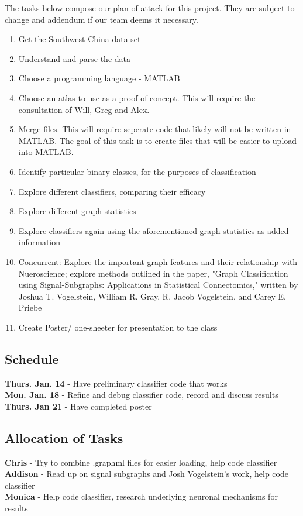\documentclass[11pt]{article} %
\begin{document}
The tasks below compose our plan of attack for this project. They are subject to change and addendum if our team deems it necessary.
\begin{enumerate}
\item Get the Southwest China data set
\item Understand and parse the data
\item Choose a programming language - MATLAB
\item Choose an atlas to use as a proof of concept. This will require the consultation of Will, Greg and Alex.
\item Merge files. This will require seperate code that likely will not be written in MATLAB. The goal of this task is to create files that will be easier to upload into MATLAB.
\item Identify particular binary classes, for the purposes of classification
\item Explore different classifiers, comparing their efficacy
\item Explore different graph statistics
\item Explore classifiers again using the aforementioned graph statistics as added information
\item Concurrent: Explore the important graph features and their relationship with Nueroscience; explore methods outlined in the paper, "Graph Classification using Signal-Subgraphs: Applications in Statistical Connectomics," written by Joshua T. Vogelstein, William R. Gray, R. Jacob Vogelstein, and Carey E. Priebe 
\item Create Poster/ one-sheeter for presentation to the class
\end{enumerate}

\subsection{Schedule}
\textbf{Thurs. Jan. 14} - Have preliminary classifier code that works\\
\textbf{Mon. Jan. 18} - Refine and debug classifier code, record and discuss results\\
\textbf{Thurs. Jan 21} - Have completed poster

\subsection{Allocation of Tasks}
\textbf{Chris} - Try to combine .graphml files for easier loading, help code classifier\\
\textbf{Addison} - Read up on signal subgraphs and Josh Vogelstein's work, help code classifier\\
\textbf{Monica} - Help code classifier, research underlying neuronal mechanisms for results

{}

\end{document}
